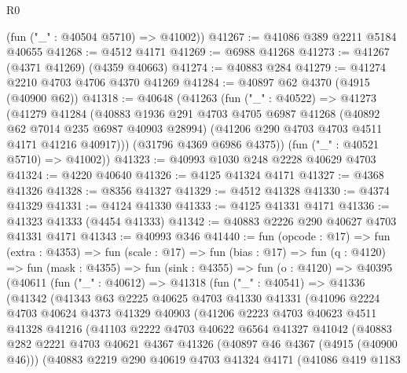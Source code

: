 \begin{lexlean}{R0}
\begin{coremodule}
      (fun ("_" : @40504 @5710) => @41002))
@41267 := @41086 @389 @2211 @5184 @40655
@41268 := @4512 @4171
@41269 := @6988 @41268
@41273 := @41267 (@4371 @41269) (@4359 @40663)
@41274 := @40883 @284
@41279 := @41274 @2210 @4703 @4706 @4370 @41269
@41284 := @40897 @62 @4370 (@4915 (@40900 @62))
@41318 := @40648
    (@41263
      (fun ("_" : @40522) =>
      @41273
        (@41279
          @41284
          (@40883
            @1936
            @291
            @4703
            @4705
            @6987
            @41268
            (@40892 @62 @7014 @235 @6987 @40903 @28994)
            (@41206 @290 @4703 @4703 @4511 @4171 @41216 @40917)))
        (@31796 @4369 @6986 @4375))
      (fun ("_" : @40521 @5710) => @41002))
@41323 := @40993 @1030 @248 @2228 @40629 @4703
@41324 := @4220 @40640
@41326 := @4125 @41324 @4171
@41327 := @4368 @41326
@41328 := @8356 @41327
@41329 := @4512 @41328
@41330 := @4374 @41329
@41331 := @4124 @41330
@41333 := @4125 @41331 @4171
@41336 := @41323 @41333 (@4454 @41333)
@41342 := @40883 @2226 @290 @40627 @4703 @41331 @4171
@41343 := @40993 @346
@41440 := fun (opcode : @17) =>
  fun (extra : @4353) =>
  fun (scale : @17) =>
  fun (bias : @17) =>
  fun (q : @4120) =>
  fun (mask : @4355) =>
  fun (sink : @4355) =>
  fun (o : @4120) =>
  @40395
    (@40611
      (fun ("_" : @40612) =>
      @41318
        (fun ("_" : @40541) =>
        @41336
          (@41342
            (@41343
              @63
              @2225
              @40625
              @4703
              @41330
              @41331
              (@41096
                @2224
                @4703
                @40624
                @4373
                @41329
                @40903
                (@41206
                  @2223
                  @4703
                  @40623
                  @4511
                  @41328
                  @41216
                  (@41103
                    @2222
                    @4703
                    @40622
                    @6564
                    @41327
                    @41042
                    (@40883
                      @282
                      @2221
                      @4703
                      @40621
                      @4367
                      @41326
                      (@40897 @46 @4367 (@4915 (@40900 @46)))
                      (@40883
                        @2219
                        @290
                        @40619
                        @4703
                        @41324
                        @4171
                        (@41086
                          @419
                          @1183

\end{coremodule}
\end{lexlean}
